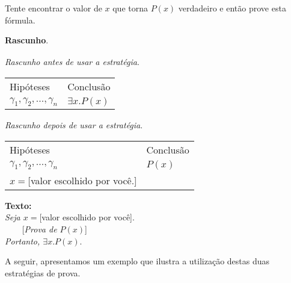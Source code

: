 \begin{ProofStrategy}\label{quant2}
Tente encontrar o valor de $x$ que torna $P(x)$ verdadeiro e então
prove esta fórmula.
\begin{flushleft}
 \textbf{Rascunho}.\\
\verb| |\\

\textit{Rascunho antes de usar a estratégia}.
\verb| |\\
\begin{tabular}{ll}
Hipóteses & Conclusão \\
$\gamma_1,\gamma_2,...,\gamma_n$ & $\exists x. P(x)$\\
\end{tabular}

\textit{Rascunho depois de usar a estratégia}.
\verb| |\\
\begin{tabular}{ll}
Hipóteses & Conclusão \\
$\gamma_1,\gamma_2,...,\gamma_n$ & $P(x)$\\
$x =$[valor escolhido por você.]           & \\
\end{tabular}
\end{flushleft}
\begin{flushleft}
\textbf{Texto:}\\
\textit{Seja $x =$}[valor escolhido por você].\\
\verb|    |[\textit{Prova de $P(x)$}]\\
\textit{Portanto, $\exists x.P(x)$}.
\end{flushleft}
\end{ProofStrategy}
A seguir, apresentamos um exemplo que ilustra a utilização destas duas
estratégias de prova.
